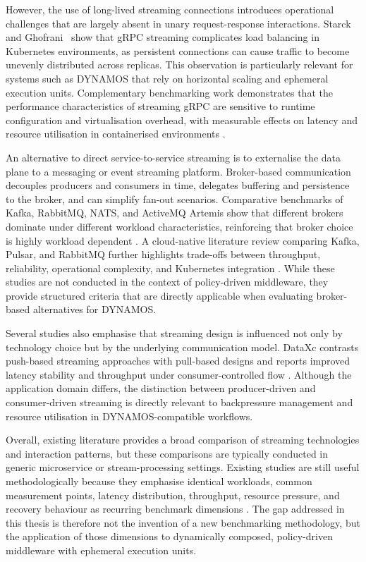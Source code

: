 However, the use of long-lived streaming connections introduces operational challenges that are largely absent in unary request-response interactions. Starck and Ghofrani~\cite{starck2023streaminglb} show that gRPC streaming complicates load balancing in Kubernetes environments, as persistent connections can cause traffic to become unevenly distributed across replicas. This observation is particularly relevant for systems such as DYNAMOS that rely on horizontal scaling and ephemeral execution units. Complementary benchmarking work demonstrates that the performance characteristics of streaming gRPC are sensitive to runtime configuration and virtualisation overhead, with measurable effects on latency and resource utilisation in containerised environments \cite{sodankoor2026grpcbench}.

An alternative to direct service-to-service streaming is to externalise the data plane to a messaging or event streaming platform. Broker-based communication decouples producers and consumers in time, delegates buffering and persistence to the broker, and can simplify fan-out scenarios. Comparative benchmarks of Kafka, RabbitMQ, NATS, and ActiveMQ Artemis show that different brokers dominate under different workload characteristics, reinforcing that broker choice is highly workload dependent \cite{ibrahim2026brokers}. A cloud-native literature review comparing Kafka, Pulsar, and RabbitMQ further highlights trade-offs between throughput, reliability, operational complexity, and Kubernetes integration \cite{nuikka2021cloudnative}. While these studies are not conducted in the context of policy-driven middleware, they provide structured criteria that are directly applicable when evaluating broker-based alternatives for DYNAMOS.

Several studies also emphasise that streaming design is influenced not only by technology choice but by the underlying communication model. DataXc contrasts push-based streaming approaches with pull-based designs and reports improved latency stability and throughput under consumer-controlled flow \cite{coviello2022dataxc}. Although the application domain differs, the distinction between producer-driven and consumer-driven streaming is directly relevant to backpressure management and resource utilisation in DYNAMOS-compatible workflows.

Overall, existing literature provides a broad comparison of streaming technologies and interaction patterns, but these comparisons are typically conducted in generic microservice or stream-processing settings. Existing studies are still useful methodologically because they emphasise identical workloads, common measurement points, latency distribution, throughput, resource pressure, and recovery behaviour as recurring benchmark dimensions \cite{karimov2018benchmarking,Henning2021ScalabilityMetrics,systematicstreaming,ciftci2025ipcmechanisms}. The gap addressed in this thesis is therefore not the invention of a new benchmarking methodology, but the application of those dimensions to dynamically composed, policy-driven middleware with ephemeral execution units.

